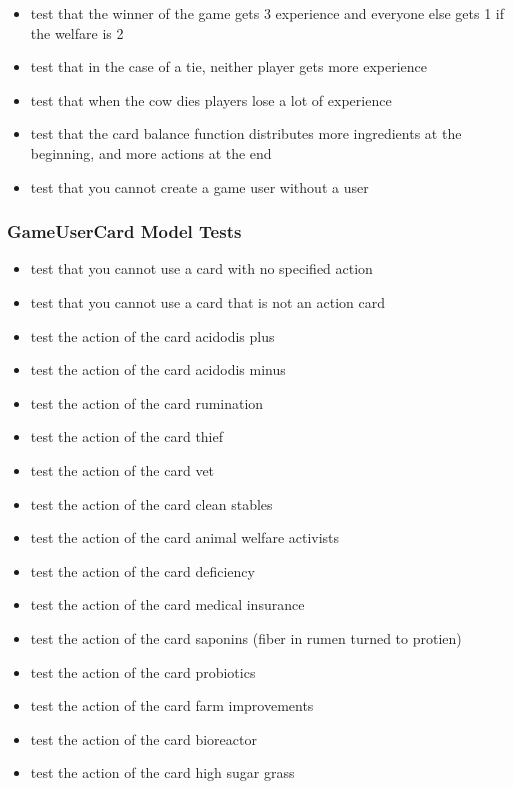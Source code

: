 \begin{itemize}
	\item test that the winner of the game gets 3 experience and everyone else gets 1 if the welfare is 2
	\item test that in the case of a tie, neither player gets more experience
	\item test that when the cow dies players lose a lot of experience
	\item test that the card balance function distributes more ingredients at the beginning, and more actions at the end
	\item test that you cannot create a game user without a user
\end{itemize}

\subsubsection{GameUserCard Model Tests}
\begin{itemize}
	\item test that you cannot use a card with no specified action
	\item test that you cannot use a card that is not an action card
	\item test the action of the card acidodis plus
	\item test the action of the card acidodis minus
	\item test the action of the card rumination
	\item test the action of the card thief
	\item test the action of the card vet
	\item test the action of the card clean stables
	\item test the action of the card animal welfare activists
	\item test the action of the card deficiency
	\item test the action of the card medical insurance
	\item test the action of the card saponins (fiber in rumen turned to protien)
	\item test the action of the card probiotics
	\item test the action of the card farm improvements
	\item test the action of the card bioreactor
	\item test the action of the card high sugar grass
\end{itemize}

